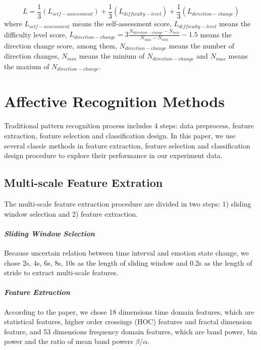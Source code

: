 \documentclass[runningheads,a4paper]{llncs}
\begin{document}
\begin{equation}
  L = \frac{1}{3}(L_{self-assessment}) + \frac{1}{3}(L_{difficulty-level}) +
      \frac{1}{3}(L_{direction-change})
\end{equation}
where $L_{self-assessment}$ means the self-assessment score, $L_{difficulty-level}$
 means the difficulty level score, $L_{direction-change} = 3\frac{N_{direction-change} - N_{min}}
{N_{max} - N_{min}} - 1.5$ means the direction change score, among them,
$N_{direction-change}$ means the number of direction changes,
$N_{min}$ means the minium of $N_{direction-change}$ and
$N_{max}$ means the maxium of $N_{direction-change}$.

\section{Affective Recognition Methods}
Traditional pattern recognition process includes 4 steps: data preprocess,
feature extraction, feature selection and classification design. In this paper,
we use several classic methods in feature extraction, feature selection
and classification design procedure to explore their performance in
our experiment data.

\subsection{Multi-scale Feature Extration}
The multi-scale feature extraction procedure are divided in two steps:
1) sliding window selection and
2) feature extraction.

\paragraph{\textbf{\emph{Sliding Window Selection}}}

Because uncertain relation between time interval and emotion state change,
we chose 2s, 4s, 6s, 8s, 10s as the length of sliding window and 0.2s
as the length of stride to extract multi-scale features.

\paragraph{\textbf{\emph{Feature Extraction}}}
According to the paper\cite{Feature}, we chose 18 dimensions time domain features,
which are statistical features,
higher order crossings (HOC) features and fractal dimension feature, and 53
dimensions frequency domain features, which are band power, bin power and
the ratio of mean band powers $\beta/\alpha$.
\end{document}

